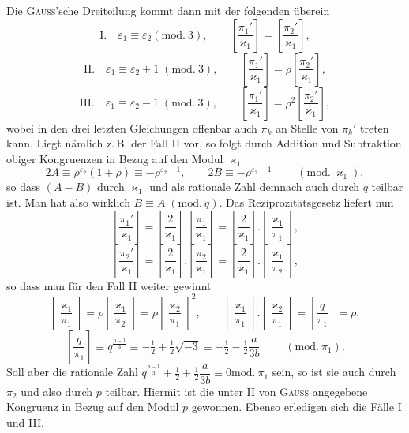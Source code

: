 \noindent Die \textsc{Gauss}'sche Dreiteilung kommt dann mit der folgenden überein
\[
\text{I.}\quad \varepsilon_1\equiv \varepsilon_2 (\mathrm{mod.}\ 3),\qquad \left[\dfrac{\pi_1'}{\varkappa_1}\right]=\left[\dfrac{\pi_2'}{\varkappa_1}\right],
\]
\[
\text{II.}\quad \varepsilon_1\equiv \varepsilon_2+1\;(\mathrm{mod.}\ 3),\qquad \left[\dfrac{\pi_1'}{\varkappa_1}\right]=\rho\left[\dfrac{\pi_2'}{\varkappa_1}\right],
\]
\[
\text{III.}\quad \varepsilon_1\equiv \varepsilon_2-1\;(\mathrm{mod.}\ 3),\qquad \left[\dfrac{\pi_1'}{\varkappa_1}\right]=\rho^2\left[\dfrac{\pi_2'}{\varkappa_1}\right],
\]
wobei in den drei letzten Gleichungen offenbar auch $\pi_k$ an Stelle von $\pi_k'$ treten kann. Liegt nämlich z.\,B.
der Fall II vor, so folgt durch Addition und Subtraktion obiger Kongruenzen in Bezug auf den Modul $\varkappa_1$
\[
2A\equiv \rho^{\varepsilon_2}(1+\rho)\equiv -\rho^{\varepsilon_2-1},\qquad 2B\equiv -\rho^{\varepsilon_2-1}\qquad\;(\mathrm{mod.}\ \varkappa_1),
\]
so dass $(A-B)$ durch $\varkappa_1$ und als rationale Zahl demnach auch durch $q$ teilbar ist. Man hat also wirklich $B\equiv A\;(\mathrm{mod.}\ q)$. Das Reziprozitätsgesetz liefert nun
\[
\left[\dfrac{\pi_1'}{\varkappa_1}\right]=\left[\dfrac{2}{\varkappa_1}\right].\left[\dfrac{\pi_1}{\varkappa_1}\right]=\left[\dfrac{2}{\varkappa_1}\right].\left[\dfrac{\varkappa_1}{\pi_1}\right],
\]
\[
\left[\dfrac{\pi_2'}{\varkappa_1}\right]=\left[\dfrac{2}{\varkappa_1}\right].\left[\dfrac{\pi_2}{\varkappa_1}\right]=\left[\dfrac{2}{\varkappa_1}\right].\left[\dfrac{\varkappa_1}{\pi_2}\right],
\]
so dass man für den Fall II weiter gewinnt
\[
\left[\dfrac{\varkappa_1}{\pi_1}\right]=\rho\left[\dfrac{\varkappa_1}{\pi_2}\right]=\rho\left[\dfrac{\varkappa_2}{\pi_1}\right]^2,\qquad
\left[\dfrac{\varkappa_1}{\pi_1}\right].\left[\dfrac{\varkappa_2}{\pi_1}\right]=\left[\dfrac{q}{\pi_1}\right]=\rho,
\]
\[
\left[\dfrac{q}{\pi_1}\right]\equiv q^{\frac{p-1}{3}}\equiv -\tfrac12+\tfrac12\sqrt{-3}\equiv -\tfrac12-\tfrac12\dfrac{a}{3b}\qquad\;(\mathrm{mod.}\ \pi_1).
\]
Soll aber die rationale Zahl $q^{\frac{p-1}{3}}+\tfrac12+\tfrac12\dfrac{a}{3b}\equiv 0 \mathrm{mod.}\ \pi_1$ sein, so ist sie auch durch $\pi_2$ und also durch $p$
teilbar. Hiermit ist die unter II von \textsc{Gauss} angegebene Kongruenz in Bezug auf den Modul $p$ gewonnen.
Ebenso erledigen sich die Fälle I und III.

